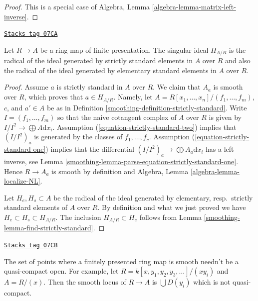 \begin{proof}
This is a special case of
Algebra, Lemma \ref{algebra-lemma-matrix-left-inverse}.
\end{proof}

\begin{lemma}[Elkik]

\label{smoothing-lemma-elkik}
\href{https://stacks.math.columbia.edu/tag/07CA}{\texttt{Stacks tag 07CA}}

Let $R \to A$ be a ring map of finite presentation.
The singular ideal $H_{A/R}$ is the radical of the ideal
generated by strictly standard elements in $A$ over $R$
and also the radical of the ideal generated by elementary
standard elements in $A$ over $R$.
\end{lemma}

\begin{proof}

Assume $a$ is strictly standard in $A$ over $R$. We claim that
$A_a$ is smooth over $R$, which proves that $a \in H_{A/R}$. Namely,
let $A = R[x_1, \ldots, x_n]/(f_1, \ldots, f_m)$, $c$, and $a' \in A$
be as in Definition \ref{smoothing-definition-strictly-standard}.
Write $I = (f_1, \ldots, f_m)$ so that the naive cotangent
complex of $A$ over $R$ is given by $I/I^2 \to \bigoplus A\text{d}x_i$.
Assumption (\ref{equation-strictly-standard-two})
implies that $(I/I^2)_a$ is generated by the classes of $f_1, \ldots, f_c$.
Assumption (\ref{equation-strictly-standard-one}) implies
that the differential $(I/I^2)_a \to \bigoplus A_a\text{d}x_i$
has a left inverse, see
Lemma \ref{smoothing-lemma-parse-equation-strictly-standard-one}.
Hence $R \to A_a$ is smooth by definition and
Algebra, Lemma \ref{algebra-lemma-localize-NL}.

\medskip\noindent
Let $H_e, H_s \subset A$ be the radical of the ideal generated by
elementary, resp.\ strictly standard elements of $A$ over $R$.
By definition and what we just proved we have
$H_e \subset H_s \subset H_{A/R}$. The inclusion $H_{A/R} \subset H_e$
follows from Lemma \ref{smoothing-lemma-find-strictly-standard}.
\end{proof}

\begin{example}
\label{smoothing-example-not-quasi-compact}
\href{https://stacks.math.columbia.edu/tag/07CB}{\texttt{Stacks tag 07CB}}

The set of points where a finitely presented ring map is smooth
needn't be a quasi-compact open. For example, let
$R = k[x, y_1, y_2, y_3, \ldots]/(xy_i)$ and $A = R/(x)$.
Then the smooth locus of $R \to A$ is
$\bigcup D(y_i)$ which is not quasi-compact.
\end{example}

